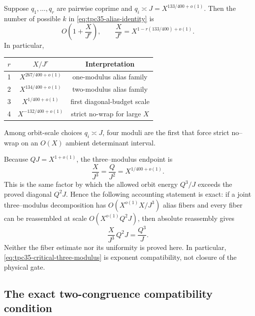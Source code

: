 \begin{corollary}
\label{cor:tpc35-alias-ladder}
Suppose \(q_1,\ldots,q_r\) are pairwise coprime and
\(q_i\asymp J=X^{133/400+o(1)}\).  Then the number of possible \(k\) in
\eqref{eq:tpc35-alias-identity} is
\begin{equation}
 O\!\left(1+\frac{X}{J^r}\right),
 \qquad
 \frac{X}{J^r}=X^{1-r(133/400)+o(1)}.
 \label{eq:tpc35-alias-count}
\end{equation}
In particular,
\begin{center}
\begin{tabular}{@{}ccc@{}}
\toprule
\(r\) & \(X/J^r\) & Interpretation \\
\midrule
1 & \(X^{267/400+o(1)}\) & one-modulus alias family \\
2 & \(X^{134/400+o(1)}\) & two-modulus alias family \\
3 & \(X^{1/400+o(1)}\) & first diagonal-budget scale \\
4 & \(X^{-132/400+o(1)}\) & strict no-wrap for large \(X\) \\
\bottomrule
\end{tabular}
\end{center}
Among orbit-scale choices \(q_i\asymp J\), four moduli are the first
that force strict no--wrap on an \(O(X)\) ambient determinant interval.
\end{corollary}

Because \(QJ=X^{1+o(1)}\), the three--modulus endpoint is
\begin{equation}
 \boxed{
 \frac{X}{J^3}=\frac{Q}{J^2}=X^{1/400+o(1)}.}
 \label{eq:tpc35-critical-three-modulus}
\end{equation}
This is the same factor by which the allowed orbit energy \(Q^3/J\)
exceeds the proved diagonal \(Q^2J\).  Hence the following accounting
statement is exact: if a joint three--modulus decomposition has
\(O(X^{o(1)}X/J^3)\) alias fibers and every fiber can be reassembled at
scale \(O(X^{o(1)}Q^2J)\), then absolute reassembly gives
\begin{equation}
 \frac{X}{J^3}\,Q^2J
 =\frac{Q^3}{J}.
 \label{eq:tpc35-conditional-alias-reassembly}
\end{equation}
Neither the fiber estimate nor its uniformity is proved here.  In
particular, \eqref{eq:tpc35-critical-three-modulus} is exponent
compatibility, not closure of the physical gate.

\subsection{The exact two-congruence compatibility condition}

